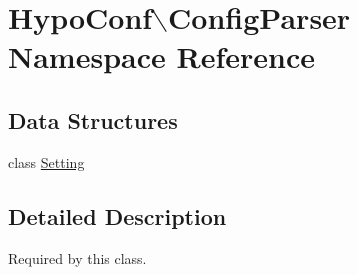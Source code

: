 \hypertarget{namespace_hypo_conf_1_1_config_parser}{
\section{\-Hypo\-Conf$\backslash$\-Config\-Parser \-Namespace \-Reference}
\label{namespace_hypo_conf_1_1_config_parser}
}
\subsection*{\-Data \-Structures}
\begin{DoxyCompactItemize}
\item 
class \hyperlink{class_hypo_conf_1_1_config_parser_1_1_setting}{\-Setting}
\end{DoxyCompactItemize}


\subsection{\-Detailed \-Description}
\-Required by this class. 